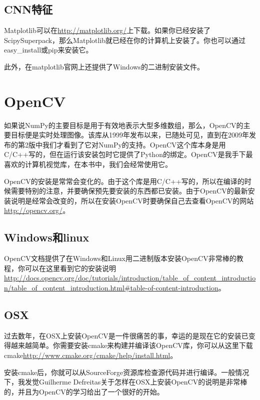 \documentclass[color=cyan,mathpazo,titlestyle=hang]{elegantbook}
\begin{document}
\subsection{CNN特征}

Matplotlib可以在\url{http://matplotlib.org/}上下载。如果你已经安装了ScipySuperpack，那么Matplotlib就已经在你的计算机上安装了。你也可以通过easy\_install或pip来安装它。

此外，在matplotlib官网上还提供了Windows的二进制安装文件。

\section{OpenCV}

如果说NumPy的主要目标是用于有效地表示大型多维数组，那么，OpenCV的主要目标便是实时处理图像。该库从1999年发布以来，已随处可见，直到在2009年发布的第2版中我们才看到了它对NumPy的支持。OpenCV这个库本身是用C/C++写的，但在运行该安装包时它提供了Python的绑定。OpenCV是我手下最喜欢的计算机视觉库，在本书中，我们会经常使用它。

OpenCV的安装是常常会变化的。由于这个库是用C/C++写的，所以在编译的时候需要特别的注意，并要确保预先要安装的东西都已安装。由于OpenCV的最新安装说明是经常会改变的，所以在安装OpenCV时要确保自己去查看OpenCV的网站\url{http://opencv.org/}。

\subsection{Windows和linux}

OpenCV文档提供了在Windows和Linux用二进制版本安装OpenCV非常棒的教程，你可以在这里看到它的安装说明\url{http://docs.opencv.org/doc/tutorials/introduction/table_of_content_introduction/table_of_content_introduction.html#table-of-content-introduction}。

\subsection{OSX}

过去数年，在OSX上安装OpenCV是一件很痛苦的事，幸运的是现在它的安装已变得越来越简单。你需要安装cmake来构建并编译该OpenCV库，你可以从这里下载cmake\href{http://www.cmake.org/cmake/help/install.html}{http://www.cmake.org/cmake/help/install.html}。

安装cmake后，你就可以从SourceForge资源库检查源代码并进行编译。一般情况下，我发觉Guilherme Defreitas关于怎样在OSX上安装OpenCV的说明是非常棒的，并且为OpenCV的学习给出了一个很好的开始。
\end{document}
